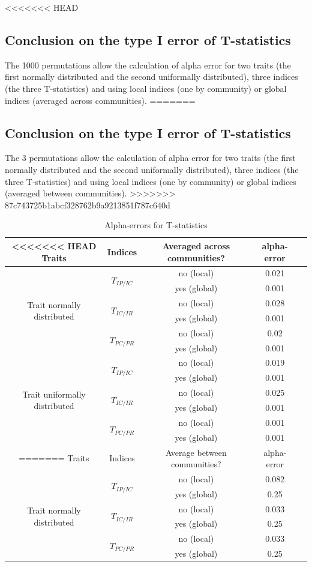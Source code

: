 \documentclass[12pt]{article}\usepackage[]{graphicx}\usepackage[]{color}
\begin{document}
\begin{landscape}
<<<<<<< HEAD

\clearpage
  \subsection {Conclusion on the type I error of T-statistics}

The 1000 permutations allow the calculation of alpha error for two traits (the first normally distributed and the second uniformally distributed), three indices (the three T-statistics) and using local indices (one by community) or global indices (averaged across communities).
=======
  \subsection {Conclusion on the type I error of T-statistics}

The 3 permutations allow the calculation of alpha error for two traits (the first normally distributed and the second uniformally distributed), three indices (the three T-statistics) and using local indices (one by community) or global indices (averaged between communities).
>>>>>>> 87c743725b1abcf328762b9a9213851f787c640d

\begin{table}[h!]
\begin{center}
\caption{Alpha-errors for T-statistics}
\label{tab:Alpha-errors_for_T-stats}
\begin{tabular}{|c|c|c|c|c|}
\hline
<<<<<<< HEAD
Traits & Indices & Averaged across communities? & alpha-error \tabularnewline
\hline \hline \hline
\multirow{6}{*}{Trait normally distributed} & \multirow{2}{*}{$T_{IP/IC}$} & no (local) & 0.021 \tabularnewline
\cline{3-4} 
 & & yes (global) & 0.001 \tabularnewline
\cline{2-4} 
 & \multirow{2}{*}{$T_{IC/IR}$} & no (local) & 0.028 \tabularnewline
\cline{3-4} 
 & & yes (global) & 0.001 \tabularnewline
\cline{2-4} 
 & \multirow{2}{*}{$T_{PC/PR}$} & no (local) & 0.02 \tabularnewline
\cline{3-4}
 & & yes (global)& 0.001 \tabularnewline

\hline \hline \hline

\multirow{6}{*}{Trait uniformally distributed} & \multirow{2}{*}{$T_{IP/IC}$} & no (local) & 0.019 \tabularnewline
\cline{3-4}
 & & yes (global) &  0.001 \tabularnewline
\cline{2-4} 
 & \multirow{2}{*}{$T_{IC/IR}$} & no (local) & 0.025 \tabularnewline
\cline{3-4} 
 & & yes (global) &  0.001 \tabularnewline
\cline{2-4} 
 & \multirow{2}{*}{$T_{PC/PR}$} & no (local) & 0.001 \tabularnewline
\cline{3-4} 
 & & yes (global)&  0.001 \tabularnewline
=======
Traits & Indices & Average between communities? & alpha-error \tabularnewline
\hline \hline \hline
\multirow{6}{*}{Trait normally distributed} & \multirow{2}{*}{$T_{IP/IC}$} & no (local) & 0.082 \tabularnewline
\cline{3-4} 
 & & yes (global) & 0.25 \tabularnewline
\cline{2-4} 
 & \multirow{2}{*}{$T_{IC/IR}$} & no (local) & 0.033 \tabularnewline
\cline{3-4} 
 & & yes (global) & 0.25 \tabularnewline
\cline{2-4} 
 & \multirow{2}{*}{$T_{PC/PR}$} & no (local) & 0.033 \tabularnewline
\cline{3-4}
 & & yes (global)& 0.25 \tabularnewline


\end{tabular}
\end{center}
\end{table}
\end{landscape}
\end{document}
